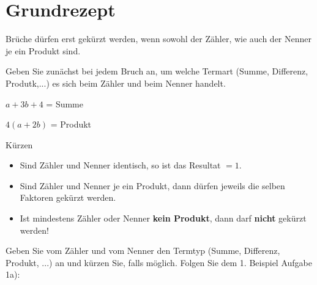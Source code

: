 

\renewcommand{\bbwAufgabenBlockID}{A1wBk}%

\usepackage{amssymb} %
\renewcommand{\metaHeaderLine}{Arbeitsblatt}
\renewcommand{\arbeitsblattTitel}{Wann Brüche kürzen?}

\arbeitsblattHeader{}
\section{Grundrezept}

Brüche dürfen erst gekürzt werden, wenn sowohl der Zähler, wie auch
der Nenner je ein Produkt sind.

Geben Sie zunächst bei jedem Bruch an, um welche Termart (Summe,
Differenz, Produtk,...) es sich beim Zähler und beim Nenner handelt.

$a+3b+4$ = Summe

$4(a+2b)$ = Produkt

\begin{rezept}{Kürzen}{}
\begin{itemize}
\item Sind Zähler und Nenner identisch, so ist das Resultat $=1$.
\item Sind Zähler und Nenner je ein Produkt, dann dürfen jeweils die
selben Faktoren gekürzt werden.
\item Ist mindestens Zähler oder Nenner \textbf{kein Produkt}, dann
darf \textbf{nicht} gekürzt werden!
\end{itemize}
\end{rezept}

Geben Sie vom Zähler und vom Nenner den Termtyp (Summe, Differenz,
Produkt, ...) an und kürzen Sie, falls möglich. Folgen Sie dem
1. Beispiel Aufgabe 1a):


